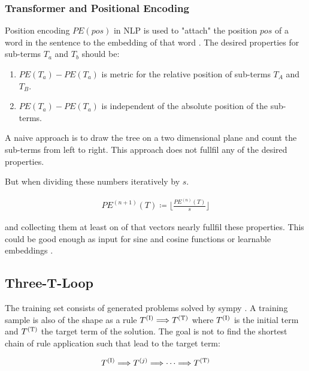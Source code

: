 \documentclass{scrartcl}
\theoremstyle{definition}
\begin{document}
\subsubsection{Transformer and Positional Encoding}

Position encoding $PE\left( pos\right)$ in NLP is used to "attach" the position $pos$ of a word in the sentence to the embedding of that word \cite{vaswani2017attention}.
The desired properties for sub-terms $T_a$ and $T_b$ should be:
\begin{enumerate}[label=(\roman*)]
	\item $PE\left( T_a \right) - PE\left( T_a \right)$ is metric for the relative position of sub-terms $T_A$ and $T_B$.
	\item $PE\left( T_a \right) - PE\left( T_a \right)$ is independent of the absolute position of the sub-terms.
\end{enumerate}

A naive approach is to draw the tree on a two dimensional plane and count the sub-terms from left to right.
This approach does not fullfil any of the desired properties.

But when dividing these numbers iteratively by $s$.

\begin{align}
	PE^{(n+1)}\left( T \right) \coloneqq \lfloor \frac{PE^{(n)} \left( T \right)}{s} \rfloor
\end{align}

and collecting them at least on of that vectors nearly fullfil these properties. 
This could be good enough as input for sine and cosine functions or learnable embeddings \cite{gehring2017convolutional}.


\subsection{Three-T-Loop}

The training set consists of generated problems solved by sympy \cite{10.7717/peerj-cs.103}.
A training sample is also of the shape as a rule $T^{(\text I)} \Longrightarrow T^{(\text T)}$ where $T^{(\text I)}$ is the initial term and $T^{(\text T)}$ the target term of the solution.
The goal is not to find the shortest chain of rule application such that lead to the target term:

\begin{align}
	T^{(\text I)} \Longrightarrow T^{(j)} \Longrightarrow \cdots \Longrightarrow T^{(\text T)}
	\label{eq:calculation_chain}
\end{align}
\end{document}
